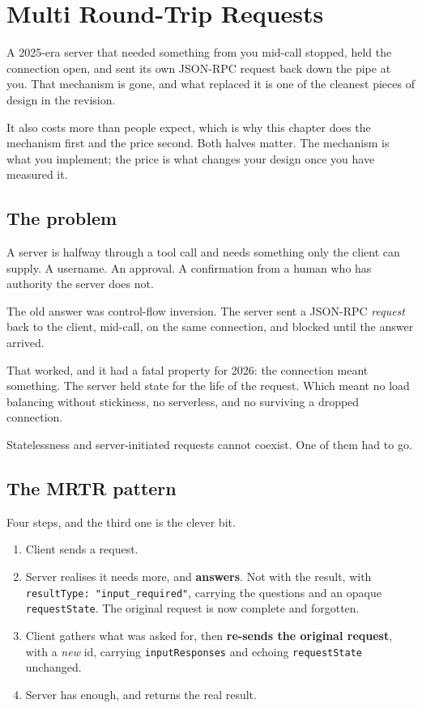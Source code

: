 \chapter{Multi Round-Trip Requests}
\label{ch:mrtr}

A 2025-era server that needed something from you mid-call stopped, held the
connection open, and sent its own JSON-RPC request back down the pipe at you.
That mechanism is gone, and what replaced it is one of the cleanest pieces of
design in the revision.

It also costs more than people expect, which is why this chapter does the
mechanism first and the price second. Both halves matter. The mechanism is what
you implement; the price is what changes your design once you have measured
it.

\section{The problem}

A server is halfway through a tool call and needs something only the client can
supply. A username. An approval. A confirmation from a human who has authority
the server does not.

The old answer was control-flow inversion. The server sent a JSON-RPC
\emph{request} back to the client, mid-call, on the same connection, and blocked
until the answer arrived.


That worked, and it had a fatal property for 2026: the connection meant
something. The server held state for the life of the request. Which meant no
load balancing without stickiness, no serverless, and no surviving a dropped
connection.

Statelessness and server-initiated requests cannot coexist. One of them had to
go.

\section{The MRTR pattern}

Four steps, and the third one is the clever bit.

\begin{enumerate}[leftmargin=1.6em, itemsep=3pt]
\item Client sends a request.
\item Server realises it needs more, and \textbf{answers}. Not with the result,
with \texttt{resultType: "input\_required"}, carrying the questions and an opaque
\texttt{requestState}. The original request is now complete and forgotten.
\item Client gathers what was asked for, then \textbf{re-sends the original
request}, with a \emph{new} id, carrying \texttt{inputResponses} and echoing
\texttt{requestState} unchanged.
\item Server has enough, and returns the real result.
\end{enumerate}

